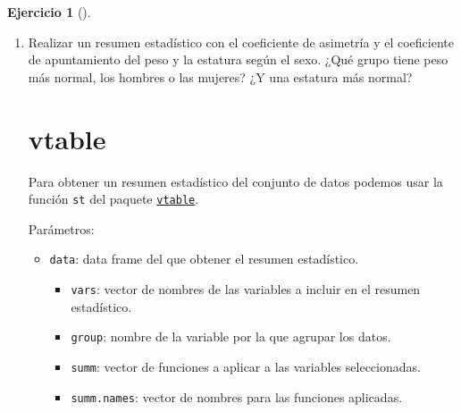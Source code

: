 \documentclass[
  a4paper,
]{scrreport}
\newenvironment{Shaded}{\begin{snugshade}}{\end{snugshade}}
\newcommand{\ExtensionTok}[1]{\textcolor[rgb]{0.00,0.23,0.31}{#1}}
\newcommand{\NormalTok}[1]{\textcolor[rgb]{0.00,0.23,0.31}{#1}}
\providecommand{\tightlist}{%
  \setlength{\itemsep}{0pt}\setlength{\parskip}{0pt}}\usepackage{longtable,booktabs,array}
\theoremstyle{definition}
\newtheorem{exercise}{Ejercicio}[chapter]
\theoremstyle{remark}
\begin{document}
\begin{exercise}[]
\begin{enumerate}
\begin{tcolorbox}
\begin{Shaded}
\begin{Highlighting}[]
\ExtensionTok{Calcular}\NormalTok{ la media, la desviación típica y el coeficiente de variación de las columnas numéricas del data frame df.}

\ExtensionTok{Interpreta}\NormalTok{ el resultado obtenido para determinar en qué variable es más representativa la media.}
\end{Highlighting}
\end{Shaded}

  La variable con el coeficiente de variación más pequeño es la altura,
  por lo que es la que tiene la media más representativa.

  \end{tcolorbox}
\item
  Realizar un resumen estadístico con el coeficiente de asimetría y el
  coeficiente de apuntamiento del peso y la estatura según el sexo. ¿Qué
  grupo tiene peso más normal, los hombres o las mujeres? ¿Y una
  estatura más normal?

  \begin{tcolorbox}[enhanced jigsaw, colframe=quarto-callout-tip-color-frame, toprule=.15mm, bottomtitle=1mm, breakable, opacitybacktitle=0.6, toptitle=1mm, colback=white, bottomrule=.15mm, title=\textcolor{quarto-callout-tip-color}{\faLightbulb}\hspace{0.5em}{Solución}, arc=.35mm, left=2mm, titlerule=0mm, rightrule=.15mm, coltitle=black, leftrule=.75mm, opacityback=0, colbacktitle=quarto-callout-tip-color!10!white]

  \section{vtable}

  Para obtener un resumen estadístico del conjunto de datos podemos usar
  la función \texttt{st} del paquete
  \href{https://cran.r-project.org/web/packages/vtable/vignettes/sumtable.html}{\texttt{vtable}}.

  Parámetros:

  \begin{itemize}
  \tightlist
  \item
    \texttt{data}: data frame del que obtener el resumen estadístico.

    \begin{itemize}
    \tightlist
    \item
      \texttt{vars}: vector de nombres de las variables a incluir en el
      resumen estadístico.
    \item
      \texttt{group}: nombre de la variable por la que agrupar los
      datos.
    \item
      \texttt{summ}: vector de funciones a aplicar a las variables
      seleccionadas.
    \item
      \texttt{summ.names}: vector de nombres para las funciones
      aplicadas.
    \end{itemize}
  \end{itemize}


\end{tcolorbox}
\end{enumerate}
\end{exercise}
\end{document}
